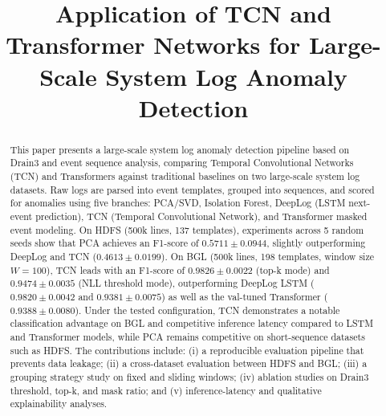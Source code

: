 \documentclass[conference]{IEEEtran}
\begin{document}
\title{
\textbf{Application of TCN and Transformer Networks for Large-Scale System Log Anomaly Detection}\\[0.8em]
}

\author{
\and
{}
}

\maketitle

\begin{abstract}
This paper presents a large-scale system log anomaly detection pipeline based on Drain3 and event sequence analysis, comparing Temporal Convolutional Networks (TCN) and Transformers against traditional baselines on two large-scale system log datasets. Raw logs are parsed into event templates, grouped into sequences, and scored for anomalies using five branches: PCA/SVD, Isolation Forest, DeepLog (LSTM next-event prediction), TCN (Temporal Convolutional Network), and Transformer masked event modeling. On HDFS (500k lines, 137 templates), experiments across 5 random seeds show that PCA achieves an F1-score of $0.5711 \pm 0.0944$, slightly outperforming DeepLog and TCN ($0.4613 \pm 0.0199$). On BGL (500k lines, 198 templates, window size $W{=}100$), TCN leads with an F1-score of $0.9826 \pm 0.0022$ (top-k mode) and $0.9474 \pm 0.0035$ (NLL threshold mode), outperforming DeepLog LSTM ($0.9820 \pm 0.0042$ and $0.9381 \pm 0.0075$) as well as the val-tuned Transformer ($0.9388 \pm 0.0080$). Under the tested configuration, TCN demonstrates a notable classification advantage on BGL and competitive inference latency compared to LSTM and Transformer models, while PCA remains competitive on short-sequence datasets such as HDFS. The contributions include: (i) a reproducible evaluation pipeline that prevents data leakage; (ii) a cross-dataset evaluation between HDFS and BGL; (iii) a grouping strategy study on fixed and sliding windows; (iv) ablation studies on Drain3 threshold, top-k, and mask ratio; and (v) inference-latency and qualitative explainability analyses.
\end{abstract}
\end{document}
